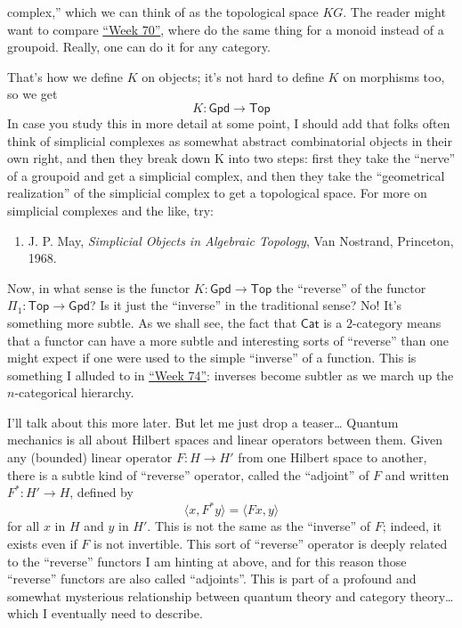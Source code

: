 \documentclass{article}
\def\tightlist{}
\begin{document}
complex,'' which we can think of as the topological space \(KG\). The
reader might want to compare \protect\hyperlink{week70}{``Week 70''},
where do the same thing for a monoid instead of a groupoid. Really, one
can do it for any category.

That's how we define \(K\) on objects; it's not hard to define \(K\) on
morphisms too, so we get \[K\colon\mathsf{Gpd}\to\mathsf{Top}\] In case
you study this in more detail at some point, I should add that folks
often think of simplicial complexes as somewhat abstract combinatorial
objects in their own right, and then they break down K into two steps:
first they take the ``nerve'' of a groupoid and get a simplicial
complex, and then they take the ``geometrical realization'' of the
simplicial complex to get a topological space. For more on simplicial
complexes and the like, try:

\begin{enumerate}
\def\labelenumi{\arabic{enumi})}
\tightlist
\item
  J. P. May, \emph{Simplicial Objects in Algebraic Topology}, Van
  Nostrand, Princeton, 1968.
\end{enumerate}

Now, in what sense is the functor \(K\colon\mathsf{Gpd}\to\mathsf{Top}\)
the ``reverse'' of the functor
\(\Pi_1\colon\mathsf{Top}\to\mathsf{Gpd}\)? Is it just the ``inverse''
in the traditional sense? No! It's something more subtle. As we shall
see, the fact that \(\mathsf{Cat}\) is a \(2\)-category means that a
functor can have a more subtle and interesting sorts of ``reverse'' than
one might expect if one were used to the simple ``inverse'' of a
function. This is something I alluded to in
\protect\hyperlink{week74}{``Week 74''}: inverses become subtler as we
march up the \(n\)-categorical hierarchy.

I'll talk about this more later. But let me just drop a teaser\ldots{}
Quantum mechanics is all about Hilbert spaces and linear operators
between them. Given any (bounded) linear operator \(F\colon H\to H'\)
from one Hilbert space to another, there is a subtle kind of ``reverse''
operator, called the ``adjoint'' of \(F\) and written
\(F^*\colon H'\to H\), defined by
\[\langle x,F^*y \rangle = \langle Fx,y \rangle\] for all \(x\) in \(H\)
and \(y\) in \(H'\). This is not the same as the ``inverse'' of \(F\);
indeed, it exists even if \(F\) is not invertible. This sort of
``reverse'' operator is deeply related to the ``reverse'' functors I am
hinting at above, and for this reason those ``reverse'' functors are
also called ``adjoints''. This is part of a profound and somewhat
mysterious relationship between quantum theory and category
theory\ldots{} which I eventually need to describe.
\end{document}
